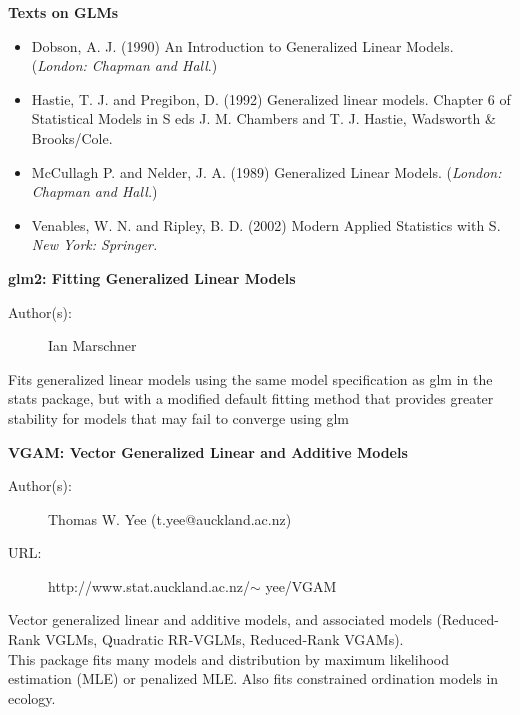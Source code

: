 \documentclass[MASTER.tex]{subfiles}
\begin{document}
\begin{frame}
	\large
	\textbf{Texts on GLMs}\\ \bigskip
\begin{itemize}
\item Dobson, A. J. (1990) An Introduction to Generalized Linear Models. (\textit{London: Chapman and Hall}.)
\bigskip
\item Hastie, T. J. and Pregibon, D. (1992) Generalized linear models. Chapter 6 of Statistical Models in S eds J. M. Chambers and T. J. Hastie, Wadsworth \& Brooks/Cole.
\bigskip
\item McCullagh P. and Nelder, J. A. (1989) Generalized Linear Models. (\textit{London: Chapman and Hall.})
\bigskip
\item Venables, W. N. and Ripley, B. D. (2002) Modern Applied Statistics with S. \textit{New York: Springer.}
\end{itemize}

\end{frame}
\begin{frame}
	\textbf{glm2: Fitting Generalized Linear Models}
\begin{description}
	\item[Author(s):] Ian Marschner 

\end{description}
Fits generalized linear models using the same model specification as glm in the stats package, but with a modified default fitting method that provides greater stability for models that may fail to converge using glm
\end{frame}
\begin{frame}
	\textbf{VGAM: Vector Generalized Linear and Additive Models}
\begin{description}
\item[Author(s):] Thomas W. Yee (t.yee@auckland.ac.nz)
\item[URL:] http://www.stat.auckland.ac.nz/$\sim$ yee/VGAM
\end{description}\bigskip
Vector generalized linear and additive models, and associated models (Reduced-Rank VGLMs, Quadratic RR-VGLMs, Reduced-Rank VGAMs). \\ \bigskip This package fits many models and distribution by maximum likelihood estimation (MLE) or penalized MLE. Also fits constrained ordination models in ecology.
\end{frame}
\end{document}
